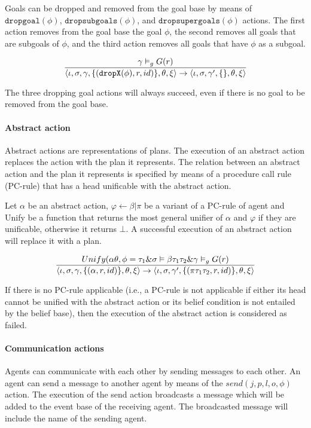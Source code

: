 \documentclass[a4paper]{article}
\begin{document}
Goals can be dropped and removed from the goal base by means of $\texttt{dropgoal}(\phi)$, $\texttt{dropsubgoals}(\phi)$, and $\texttt{dropsupergoals}(\phi)$ actions. The first action removes from the goal base the goal $\phi$, the second removes all goals that are subgoals of $\phi$, and the third action removes all goals that have $\phi$ as a subgoal.

$$ {{\gamma \vDash_{g} G(r)} \over {\langle \iota, \sigma, \gamma, \{(\texttt{dropX}(\phi), r, id)\}, \theta, \xi \rangle  \rightarrow \langle \iota, \sigma, \gamma', \{\}, \theta, \xi \rangle}} $$

The three dropping goal actions will always succeed, even if there is no goal to be removed from the goal base.

\paragraph{Abstract action}

Abstract actions are representations of plans. The execution of an abstract action replaces the action with the plan it represents. The relation between an abstract action and the plan it represents is specified by means of a procedure call rule (PC-rule) that has a head unificable with the abstract action.

Let $\alpha$ be an abstract action, $\varphi \leftarrow \beta \vert \pi$ be a variant of a PC-rule of agent and Unify be a function that returns the most general unifier of $\alpha$ and $\varphi$ if they are unificable, otherwise it returns $\bot$. A successful execution of an abstract action will replace it with a plan.

$$ {{Unify(\alpha\theta, \phi = \tau_{1} \& \sigma \vDash \beta\tau_{1}\tau_{2} \& \gamma \vDash_{g} G(r) } \over {\langle \iota, \sigma, \gamma, \{(\alpha, r, id)\}, \theta, \xi \rangle  \rightarrow \langle \iota, \sigma, \gamma', \{(\pi\tau_{1}\tau_{2}, r, id)\}, \theta, \xi \rangle}} $$

If there is no PC-rule applicable (i.e., a PC-rule is not applicable if either its head cannot be unified with the abstract action or its belief condition is not entailed by the belief base), then the execution of the abstract action is considered as failed.

\paragraph{Communication actions}

Agents can communicate with each other by sending messages to each other. An agent can send a message to another agent by means of the $send(j, p, l, o, \phi)$ action. The execution of the send action broadcasts a message which will be added to the event base of the receiving agent. The broadcasted message will include the name of the sending agent.
\end{document}
